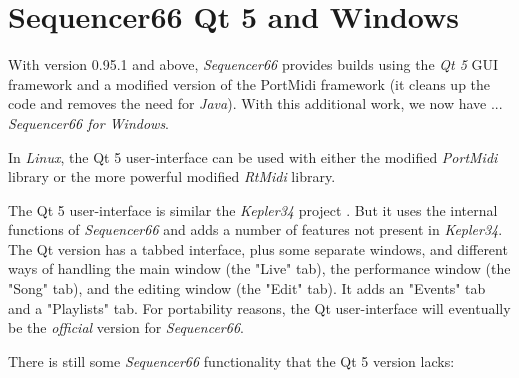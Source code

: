 %
%
%
%

\section{Sequencer66 Qt 5 and Windows}
\label{sec:qt_portmidi}

   With version 0.95.1 and above,
   \textsl{Sequencer66} provides builds using
   the \textsl{Qt 5} GUI framework and a modified version of the
   PortMidi framework (it cleans up the code and removes the need for
   \textsl{Java}).
   With this additional work, we now have ...
   \textsl{Sequencer66 for Windows}.

   In \textsl{Linux}, the Qt 5 user-interface can be used with either the
   modified \textsl{PortMidi} library or the more powerful modified
   \textsl{RtMidi} library.

   The Qt 5 user-interface is similar
   the \textsl{Kepler34} project \cite{kepler34}.
   But it uses the internal functions of \textsl{Sequencer66} and adds a
   number of features not present in \textsl{Kepler34}.
   The Qt version has a tabbed interface, plus some separate windows,
   and different ways of handling the main
   window (the "Live" tab), the performance window (the "Song" tab), and the
   editing window (the "Edit" tab).
   It adds an "Events" tab and a "Playlists" tab.
   For portability reasons, the Qt user-interface will eventually be the
   \textsl{official} version for \textsl{Sequencer66}.

   There is still some \textsl{Sequencer66} functionality that
   the Qt 5 version lacks:

